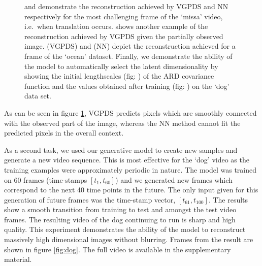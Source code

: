 \documentclass{article} %
\begin{document}
\begin{figure}[ht]
\begin{center}
{}
\end{center}
\caption{\small{
 and  demonstrate the reconstruction achieved by VGPDS and NN respectively for the most challenging frame  of the `missa' video, i.e.\ when translation occurs.  shows another example of the reconstruction achieved by VGPDS given the partially observed image.  (VGPDS) and  (NN) depict the reconstruction achieved for a frame of the `ocean' dataset. 
Finally, we demonstrate the ability of the model to automatically select the latent dimensionality by showing the initial lengthscales (fig: ) of the ARD covariance function and the values obtained after training (fig: ) on the `dog' data set.
}
}
\label{fig:video1}
\end{figure}
As can be seen in figure \ref{fig:video1}, VGPDS predicts pixels which are smoothly connected with the observed part of the image, whereas the NN method cannot fit the predicted pixels in the overall context.


\par As a second task, we used our generative model to create new
samples and generate a new video sequence. This is most effective for
the `dog' video as the training examples were approximately periodic
in nature. The model was trained on 60 frames (time-stamps $[t_1,
t_{60}]$) and we generated new frames which correspond to the next
40 time points in the future. The only input given for this generation
of future frames was the time-stamp vector, $[t_{61}, t_{100}]$. The
results show a smooth transition from training to test and amongst the
test video frames. The resulting video of the dog continuing to run is
sharp and high quality. This experiment demonstrates the ability of
the model to reconstruct massively high dimensional images without
blurring. Frames from the result are shown in figure
\ref{fig:dog}. The full video is available in the supplementary
material.
\end{document}
